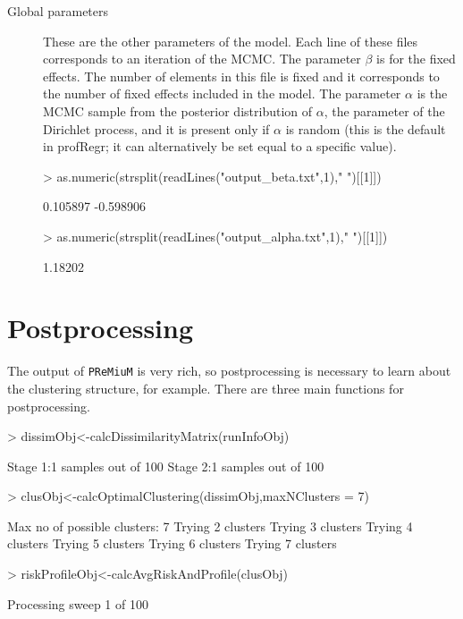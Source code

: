 \documentclass{article}
\begin{document}
\begin{description}
\item[Global parameters] These are the other parameters of the model. Each line of these files corresponds to an iteration of the MCMC. The parameter $\beta$ is for the fixed effects. The number of elements in this file is fixed and it corresponds to the number of fixed effects included in the model. The parameter $\alpha$ is the MCMC sample from the posterior distribution of $\alpha$, the parameter of the Dirichlet process, and it is present only if $\alpha$ is random (this is the default in profRegr; it can alternatively be set equal to a specific value).
\begin{Schunk}
\begin{Sinput}
> as.numeric(strsplit(readLines("output_beta.txt",1)," ")[[1]])
\end{Sinput}
\begin{Soutput}
[1]  0.105897 -0.598906
\end{Soutput}
\begin{Sinput}
> as.numeric(strsplit(readLines("output_alpha.txt",1)," ")[[1]])
\end{Sinput}
\begin{Soutput}
[1] 1.18202
\end{Soutput}
\end{Schunk}

\end{description}


\section{Postprocessing}
The output of \verb|PReMiuM| is very rich, so postprocessing is necessary to learn about the clustering structure, for example. There are three main functions for postprocessing. 

\begin{Schunk}
\begin{Sinput}
> dissimObj<-calcDissimilarityMatrix(runInfoObj)
\end{Sinput}
\begin{Soutput}
Stage 1:1 samples out of 100
Stage 2:1 samples out of 100
\end{Soutput}
\begin{Sinput}
> clusObj<-calcOptimalClustering(dissimObj,maxNClusters = 7)
\end{Sinput}
\begin{Soutput}
Max no of possible clusters: 7 
Trying 2 clusters
Trying 3 clusters
Trying 4 clusters
Trying 5 clusters
Trying 6 clusters
Trying 7 clusters
\end{Soutput}
\begin{Sinput}
> riskProfileObj<-calcAvgRiskAndProfile(clusObj)
\end{Sinput}
\begin{Soutput}
Processing sweep 1 of  100 
\end{Soutput}
\end{Schunk}
\end{document}
